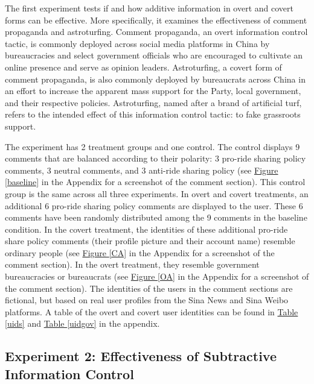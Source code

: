 \documentclass[11pt]{article}
\begin{document}
The first experiment tests if and how additive information in overt and covert forms can be effective. More specifically, it examines the effectiveness of comment propaganda and astroturfing. Comment propaganda, an overt information control tactic, is commonly deployed across social media platforms in China by bureaucracies and select government officials who are encouraged to cultivate an online presence and serve as opinion leaders. Astroturfing, a covert form of comment propaganda, is also commonly deployed by bureaucrats across China in an effort to increase the apparent mass support for the Party, local government, and their respective policies. Astroturfing, named after a brand of artificial turf, refers to the intended effect of this information control tactic: to fake grassroots support.

The experiment has 2 treatment groups and one control. The control displays 9 comments that are balanced according to their polarity: 3 pro-ride sharing policy comments, 3 neutral comments, and 3 anti-ride sharing policy (see \hyperref[baseline]{Figure \ref*{baseline}} in the Appendix for a screenshot of the comment section). This control group is the same across all three experiments. In overt and covert treatments, an additional 6 pro-ride sharing policy comments are displayed to the user. These 6 comments have been randomly distributed among the 9 comments in the baseline condition. In the covert treatment, the identities of these additional pro-ride share policy comments (their profile picture and their account name) resemble ordinary people (see \hyperref[CA]{Figure \ref*{CA}} in the Appendix for a screenshot of the comment section). In the overt treatment, they resemble government bureaucracies or bureaucrats  (see \hyperref[OA]{Figure \ref*{OA}} in the Appendix for a screenshot of the comment section). The identities of the users in the comment sections are fictional, but based on real user profiles from the Sina News and Sina Weibo platforms. A table of the overt and covert user identities can be found in \hyperref[uids]{Table \ref*{uids}} and \hyperref[uidgov]{Table \ref*{uidgov}} in the appendix.

\subsection{Experiment 2: Effectiveness of Subtractive Information Control}
\end{document}
